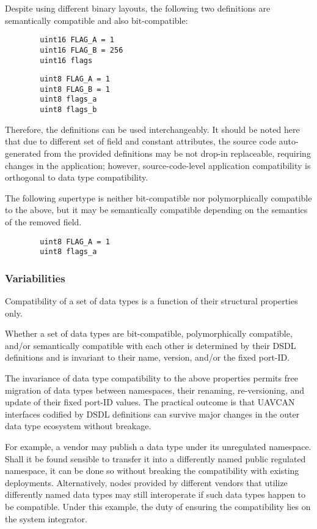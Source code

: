 \begin{remark}[breakable]
    Despite using different binary layouts, the following two definitions are semantically compatible
    and also bit-compatible:

    \begin{verbatim}
        uint16 FLAG_A = 1
        uint16 FLAG_B = 256
        uint16 flags
    \end{verbatim}

    \begin{verbatim}
        uint8 FLAG_A = 1
        uint8 FLAG_B = 1
        uint8 flags_a
        uint8 flags_b
    \end{verbatim}

    Therefore, the definitions can be used interchangeably.
    It should be noted here that due to different set of field and constant attributes,
    the source code auto-generated from the provided definitions may be not drop-in replaceable,
    requiring changes in the application;
    however, source-code-level application compatibility is orthogonal to data type compatibility.

    The following supertype is neither bit-compatible nor polymorphically compatible to the above,
    but it may be semantically compatible depending on the semantics of the removed field.

    \begin{verbatim}
        uint8 FLAG_A = 1
        uint8 flags_a
    \end{verbatim}
\end{remark}

\subsubsection{Variabilities}

Compatibility of a set of data types is a function of their structural properties only.

Whether a set of data types are bit-compatible, polymorphically compatible, and/or semantically compatible
with each other is determined by their DSDL definitions and is invariant to their name,
version, and/or the fixed port-ID.

\begin{remark}
    The invariance of data type compatibility to the above properties permits free migration of
    data types between namespaces, their renaming, re-versioning, and update of their fixed port-ID values.
    The practical outcome is that UAVCAN interfaces codified by DSDL definitions can survive
    major changes in the outer data type ecosystem without breakage.

    For example, a vendor may publish a data type under its unregulated namespace.
    Shall it be found sensible to transfer it into a differently named public regulated namespace,
    it can be done so without breaking the compatibility with existing deployments.
    Alternatively, nodes provided by different vendors that utilize differently named data types may
    still interoperate if such data types happen to be compatible.
    Under this example, the duty of ensuring the compatibility lies on the system integrator.
\end{remark}

